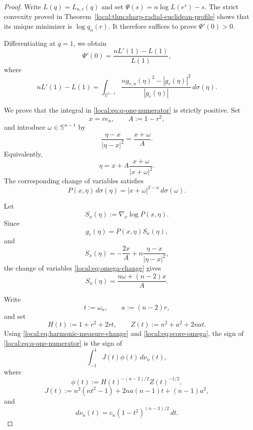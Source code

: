 \documentclass[11pt,reqno]{amsart}
\theoremstyle{remark}
\newcommand{\Sph}{\mathbb S}
\begin{document}
\begin{proof}
Write $L(q)=L_{n,r}(q)$ and set $\Psi(s)=n\log L(e^s)-s$.
The strict convexity proved in
Theorem~\ref{local:thm:sharp-radial-euclidean-profile} shows that its
unique minimizer is $\log q_n(r)$.  It therefore suffices to prove
$\Psi'(0)>0$.

Differentiating at \(q=1\), we obtain
\begin{equation}\label{local:eq:Psi-prime-one}
\Psi'(0)
=
\frac{nL'(1)-L(1)}{L(1)},
\end{equation}
where
\begin{equation}\label{local:eq:q-one-numerator}
nL'(1)-L(1)
=
\int_{\Sph^{n-1}}
\frac{
n g_{r,n}(\eta)^2-|g_r(\eta)|^2
}{
|g_r(\eta)|
}
\,d\sigma(\eta).
\end{equation}

We prove that the integral in \eqref{local:eq:q-one-numerator} is strictly
positive. Set
\[
x=re_n,
\qquad
A:=1-r^2,
\]
and introduce \(\omega\in\Sph^{n-1}\) by
\begin{equation}\label{local:eq:omega-change}
\frac{\eta-x}{|\eta-x|^2}
=
\frac{x+\omega}{A}.
\end{equation}
Equivalently,
\[
\eta
=
x+A\frac{x+\omega}{|x+\omega|^2}.
\]
The corresponding change of variables satisfies
\begin{equation}\label{local:eq:harmonic-measure-change}
P(x,\eta)\,d\sigma(\eta)
=
|x+\omega|^{2-n}\,d\sigma(\omega).
\end{equation}

Let
\[
S_x(\eta):=\nabla_x\log P(x,\eta).
\]
Since
\[
g_r(\eta)=P(x,\eta)S_x(\eta),
\]
and
\[
S_x(\eta)
=
-\frac{2x}{A}
+n\frac{\eta-x}{|\eta-x|^2},
\]
the change of variables \eqref{local:eq:omega-change} gives
\begin{equation}\label{local:eq:score-omega}
S_x(\eta)
=
\frac{n\omega+(n-2)x}{A}.
\end{equation}

Write
\[
t:=\omega_n,
\qquad
a:=(n-2)r,
\]
and set
\[
H(t):=1+r^2+2rt,
\qquad
Z(t):=n^2+a^2+2nat.
\]
Using \eqref{local:eq:harmonic-measure-change} and
\eqref{local:eq:score-omega}, the sign of
\eqref{local:eq:q-one-numerator} is the sign of
\begin{equation}\label{local:eq:Jphi-integral}
\int_{-1}^1 J(t)\phi(t)\,d\nu_n(t),
\end{equation}
where
\[
\phi(t)
:=
H(t)^{-(n-2)/2}Z(t)^{-1/2},
\]
\[
J(t)
:=
n^2(nt^2-1)
+2na(n-1)t
+(n-1)a^2,
\]
and
\[
d\nu_n(t)
=
c_n(1-t^2)^{(n-3)/2}\,dt.
\]


\end{proof}
\end{document}
